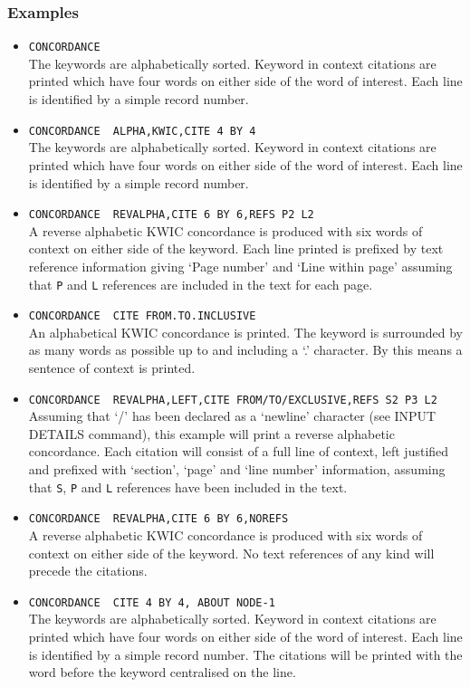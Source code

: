 \subsubsection{Examples}
\begin{itemize}
\item   \verb/CONCORDANCE/\\
    The keywords are alphabetically sorted.
    Keyword in context citations are printed which
    have four words on either side of the word of interest.  Each line is
    identified by a simple record number.
\item   \verb/CONCORDANCE  ALPHA,KWIC,CITE 4 BY 4/\\
    The keywords are alphabetically sorted.
    Keyword in context citations are printed which
    have four words on either side of the word of interest.  Each line is
    identified by a simple record number.
\item   \verb/CONCORDANCE  REVALPHA,CITE 6 BY 6,REFS P2 L2/\\
    A reverse alphabetic KWIC concordance is produced with six words
    of context on either side of the keyword.  Each line printed is
    prefixed by text reference information giving `Page number' and `Line
    within page' assuming that \verb/P/ and \verb/L/ references are included
    in the text for each page.
\item   \verb/CONCORDANCE  CITE FROM.TO.INCLUSIVE/\\
    An alphabetical KWIC concordance is printed.  The keyword is
    surrounded by as many words as possible up to and including a `.'
    character.  By this means a sentence of context is printed.
\item  \verb+CONCORDANCE  REVALPHA,LEFT,CITE FROM/TO/EXCLUSIVE,REFS S2 P3 L2+\\
    Assuming that `/' has been declared as a `newline' character
    (see INPUT DETAILS command), this example will print a reverse
    alphabetic concordance.  Each citation will consist of a full line
    of context, left justified and prefixed with `section', `page' and
    `line number' information, assuming that \verb/S/, \verb/P/ and \verb/L/
    references have been included in the text.
\item   \verb/CONCORDANCE  REVALPHA,CITE 6 BY 6,NOREFS/\\
    A reverse alphabetic KWIC concordance is produced with six words
    of context on either side of the keyword.  No text references of
    any kind will precede the citations.
\item   \verb/CONCORDANCE  CITE 4 BY 4, ABOUT NODE-1/\\
    The keywords are alphabetically sorted.
    Keyword in context citations are printed which
    have four words on either side of the word of interest.  Each line is
    identified by a simple record number. The citations will be printed
    with the word before the keyword centralised on the line.
\end{itemize}

